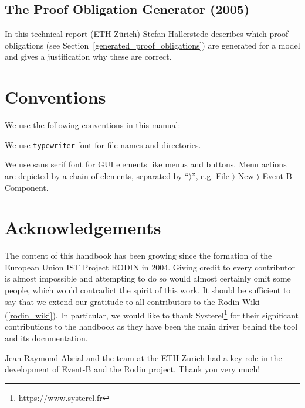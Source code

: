 \documentclass[twoside,10pt]{book}
\begin{document}
\subsection{The Proof Obligation Generator (2005)}
In this technical report (ETH Zürich)  Stefan Hallerstede describes which proof obligations
(see Section~\ref{generated_proof_obligations}) are generated for a model
and gives a justification why these are correct.

\section{Conventions}
\label{conventions}

We use the following conventions in this manual:


We use \texttt{typewriter} font for file names and directories.

We use \textsf{sans serif font} for GUI elements like menus and buttons.  Menu actions are depicted by a chain of elements, separated by ``$\rangle$'', e.g. \textsf{File $\rangle$ New $\rangle$ Event-B Component}.

\section{Acknowledgements}
\label{sec:acknowledgements}

The content of this handbook has been growing since the formation of the European Union IST Project RODIN in 2004.  Giving credit to every contributor is almost impossible and attempting to do so would almost certainly omit some people, which would contradict the spirit of this work.  It should be sufficient to say that we extend our gratitude to all contributors to the Rodin Wiki (\ref{rodin_wiki}). In particular, we would like to thank Systerel\footnote{\url{https://www.systerel.fr}} for their significant contributions to the handbook as they have been the main driver behind the tool and its documentation.

Jean-Raymond Abrial and the team at the ETH Zurich had a key role in the development of Event-B
 and the Rodin project. Thank you very much!
\end{document}
